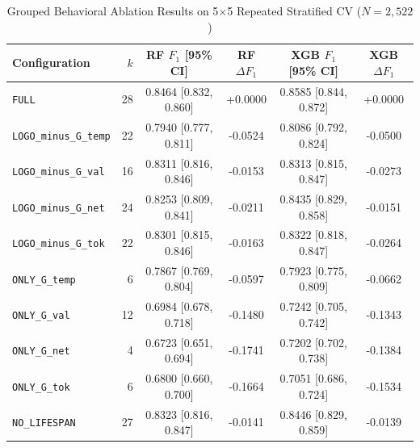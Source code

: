 \begin{table}[!htbp]
\centering
\caption{Grouped Behavioral Ablation Results on 5$\times$5 Repeated Stratified CV ($N=2{,}522$)}
\label{tab:ablation}
\footnotesize
\begin{tabularx}{\textwidth}{l r c c c c}
\toprule
\textbf{Configuration} & \textbf{$k$} & \textbf{RF $F_1$ [95\% CI]} & \textbf{RF $\Delta F_1$} & \textbf{XGB $F_1$ [95\% CI]} & \textbf{XGB $\Delta F_1$} \\
\midrule
\texttt{FULL} & 28 & 0.8464 [0.832, 0.860] & +0.0000 & 0.8585 [0.844, 0.872] & +0.0000 \\
\texttt{LOGO\_minus\_G\_temp} & 22 & 0.7940 [0.777, 0.811] & -0.0524 & 0.8086 [0.792, 0.824] & -0.0500 \\
\texttt{LOGO\_minus\_G\_val} & 16 & 0.8311 [0.816, 0.846] & -0.0153 & 0.8313 [0.815, 0.847] & -0.0273 \\
\texttt{LOGO\_minus\_G\_net} & 24 & 0.8253 [0.809, 0.841] & -0.0211 & 0.8435 [0.829, 0.858] & -0.0151 \\
\texttt{LOGO\_minus\_G\_tok} & 22 & 0.8301 [0.815, 0.846] & -0.0163 & 0.8322 [0.818, 0.847] & -0.0264 \\
\texttt{ONLY\_G\_temp} & 6 & 0.7867 [0.769, 0.804] & -0.0597 & 0.7923 [0.775, 0.809] & -0.0662 \\
\texttt{ONLY\_G\_val} & 12 & 0.6984 [0.678, 0.718] & -0.1480 & 0.7242 [0.705, 0.742] & -0.1343 \\
\texttt{ONLY\_G\_net} & 4 & 0.6723 [0.651, 0.694] & -0.1741 & 0.7202 [0.702, 0.738] & -0.1384 \\
\texttt{ONLY\_G\_tok} & 6 & 0.6800 [0.660, 0.700] & -0.1664 & 0.7051 [0.686, 0.724] & -0.1534 \\
\texttt{NO\_LIFESPAN} & 27 & 0.8323 [0.816, 0.847] & -0.0141 & 0.8446 [0.829, 0.859] & -0.0139 \\
\bottomrule
\end{tabularx}
\end{table}